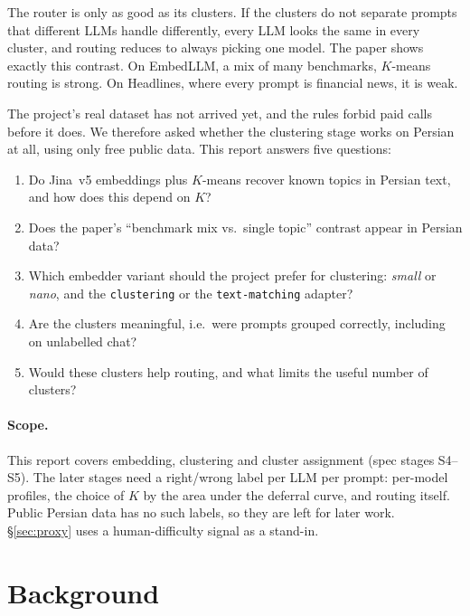 \documentclass[11pt,a4paper]{article}
\begin{document}
The router is only as good as its clusters. If the clusters do not separate prompts that different LLMs handle
differently, every LLM looks the same in every cluster, and routing reduces to always picking one model. The paper
shows exactly this contrast. On EmbedLLM, a mix of many benchmarks, $K$-means routing is strong. On Headlines,
where every prompt is financial news, it is weak.

The project's real dataset has not arrived yet, and the rules forbid paid calls before it does. We therefore asked
whether the clustering stage works on Persian at all, using only free public data. This report answers five
questions:

\begin{enumerate}[label=\textbf{RQ\arabic*}]
\item Do Jina~v5 embeddings plus $K$-means recover known topics in Persian text, and how does this depend on $K$?
\item Does the paper's ``benchmark mix vs.\ single topic'' contrast appear in Persian data?
\item Which embedder variant should the project prefer for clustering: \emph{small} or \emph{nano}, and the
  \texttt{clustering} or the \texttt{text-matching} adapter?
\item Are the clusters meaningful, i.e.\ were prompts grouped correctly, including on unlabelled chat?
\item Would these clusters help routing, and what limits the useful number of clusters?
\end{enumerate}

\paragraph{Scope.} This report covers embedding, clustering and cluster assignment (spec stages S4--S5). The later
stages need a right/wrong label per LLM per prompt: per-model profiles, the choice of $K$ by the area under the
deferral curve, and routing itself. Public Persian data has no such labels, so they are left for later work.
\S\ref{sec:proxy} uses a human-difficulty signal as a stand-in.

\section{Background}
\end{document}
